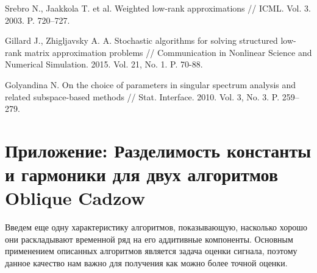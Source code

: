 \documentclass[12pt,a4paper,fleqn,leqno]{article}
\begin{document}
\begin{thebibliography}{10}
Srebro N., Jaakkola T. et al. Weighted low-rank approximations // ICML. Vol. 3. 2003.
P. 720–727.

Gillard J., Zhigljavsky A. A. Stochastic algorithms for solving structured low-rank
matrix approximation problems // Communication in Nonlinear Science and Numerical
Simulation. 2015. Vol. 21, No. 1. P. 70-88.

Golyandina N. On the choice of parameters in singular spectrum analysis and related
subspace-based methods // Stat. Interface. 2010. Vol. 3, No. 3. P. 259–279.
\end{thebibliography}


\section{Приложение: Разделимость константы и гармоники для двух алгоритмов Oblique Cadzow}
\label{sec:app}

Введем еще одну характеристику алгоритмов, показывающую, насколько хорошо они раскладывают временной ряд на его аддитивные компоненты. Основным применением описанных алгоритмов является задача оценки сигнала, поэтому данное качество нам важно для получения как можно более точной оценки.
\end{document}
